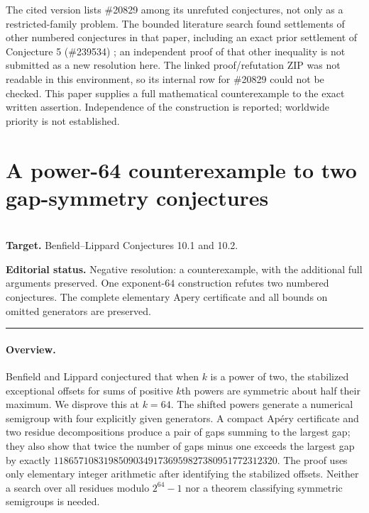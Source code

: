 \documentclass[11pt,a4paper]{article}
\begin{document}
The cited version lists \#20829 among its unrefuted conjectures,
not only as a restricted-family problem. The bounded literature
search found settlements of other numbered conjectures in that
paper, including an exact prior settlement of Conjecture 5
(\#239534) \cite{R11H:prior}; an independent proof of that other
inequality is not submitted as a new resolution here. The linked
proof/refutation ZIP was not readable in this environment, so its
internal row for \#20829 could not be checked. This paper supplies
a full mathematical counterexample to the exact written assertion.
Independence of the construction is reported; worldwide priority
is not established.
\endgroup


\clearpage

\section{A power-64 counterexample to two gap-symmetry conjectures}
\label{section:R12T}
\\[3pt]
\noindent\textbf{Target.} Benfield--Lippard Conjectures 10.1 and 10.2.

\noindent\textbf{Editorial status.} Negative resolution: a counterexample, with the additional full arguments preserved. One exponent-$64$ construction refutes two numbered conjectures. The complete elementary Apery certificate and all bounds on omitted generators are preserved.

\smallskip\hrule\medskip



\begingroup
\newcommand{\N}{\mathbb N_0}
\newcommand{\B}{\mathbf B}
\setcounter{equation}{0}
\renewcommand{\theequation}{\thesection.\arabic{equation}}
\renewcommand{\theHequation}{R12T.\arabic{equation}}
\paragraph{Overview.}
Benfield and Lippard conjectured that when $k$ is a power of two, the stabilized exceptional offsets for sums of positive $k$th powers are symmetric about half their maximum. We disprove this at $k=64$. The shifted powers generate a numerical semigroup with four explicitly given generators. A compact Ap\'ery certificate and two residue decompositions produce a pair of gaps summing to the largest gap; they also show that twice the number of gaps minus one exceeds the largest gap by exactly $118657108319850903491736959827380951772312320$. The proof uses only elementary integer arithmetic after identifying the stabilized offsets. Neither a search over all residues modulo $2^{64}-1$ nor a theorem classifying symmetric semigroups is needed.
\end{document}
